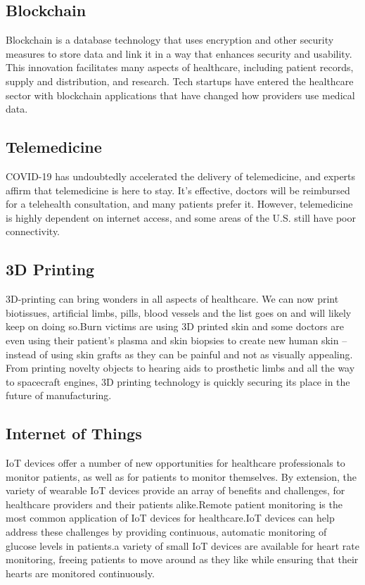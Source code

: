 \documentclass{article}
\begin{document}
\subsection{Blockchain         }
Blockchain is a database technology that uses encryption and other security measures to store data and link it in a way that enhances security and usability. This innovation facilitates many aspects of healthcare, including patient records, supply and distribution, and research. Tech startups have entered the healthcare sector with blockchain applications that have changed how providers use medical data. 
\subsection{Telemedicine     }
COVID-19 has undoubtedly accelerated the delivery of telemedicine, and experts affirm that telemedicine is here to stay. It’s effective, doctors will be reimbursed for a telehealth consultation, and many patients prefer it. However, telemedicine is highly dependent on internet access, and some areas of the U.S. still have poor connectivity.
\subsection{3D Printing}
3D-printing can bring wonders in all aspects of healthcare. We can now print
biotissues, artificial limbs, pills, blood vessels and the list goes on and will likely keep on doing so.Burn victims are using 3D printed skin and some doctors are even using their patient’s plasma and skin biopsies to create new human skin – instead of using skin grafts as they can be painful and not as visually appealing. From printing novelty objects to hearing aids to prosthetic limbs and all the way to spacecraft engines, 3D printing technology is quickly securing its place in the future of manufacturing.
\subsection{Internet of Things}
IoT devices offer a number of new opportunities for healthcare professionals to monitor patients, as well as for patients to monitor themselves. By extension, the variety of wearable IoT devices provide an array of benefits and challenges, for healthcare providers and their patients alike.Remote patient monitoring is the most common application of IoT devices for healthcare.IoT devices can help address these challenges by providing continuous, automatic monitoring of glucose levels in patients.a variety of small IoT devices are available for heart rate monitoring, freeing patients to move around as they like while ensuring that their hearts are monitored continuously. 
\end{document}
